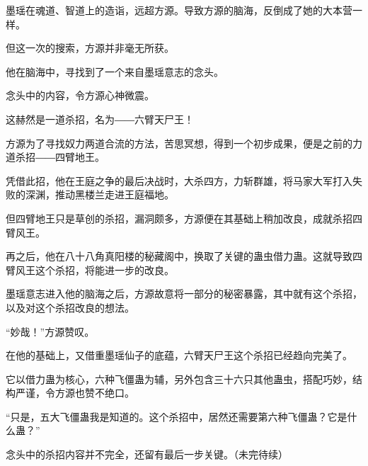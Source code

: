 \begin{this_body}
墨瑶在魂道、智道上的造诣，远超方源。导致方源的脑海，反倒成了她的大本营一样。

但这一次的搜索，方源并非毫无所获。

他在脑海中，寻找到了一个来自墨瑶意志的念头。

念头中的内容，令方源心神微震。

这赫然是一道杀招，名为――六臂天尸王！

方源为了寻找奴力两道合流的方法，苦思冥想，得到一个初步成果，便是之前的力道杀招――四臂地王。

凭借此招，他在王庭之争的最后决战时，大杀四方，力斩群雄，将马家大军打入失败的深渊，推动黑楼兰走进王庭福地。

但四臂地王只是草创的杀招，漏洞颇多，方源便在其基础上稍加改良，成就杀招四臂风王。

再之后，他在八十八角真阳楼的秘藏阁中，换取了关键的蛊虫借力蛊。这就导致四臂风王这个杀招，将能进一步的改良。

墨瑶意志进入他的脑海之后，方源故意将一部分的秘密暴露，其中就有这个杀招，以及对这个杀招改良的想法。

“妙哉！”方源赞叹。

在他的基础上，又借重墨瑶仙子的底蕴，六臂天尸王这个杀招已经趋向完美了。

它以借力蛊为核心，六种飞僵蛊为辅，另外包含三十六只其他蛊虫，搭配巧妙，结构严谨，令方源也赞不绝口。

“只是，五大飞僵蛊我是知道的。这个杀招中，居然还需要第六种飞僵蛊？它是什么蛊？”

念头中的杀招内容并不完全，还留有最后一步关键。（未完待续）

\end{this_body}

